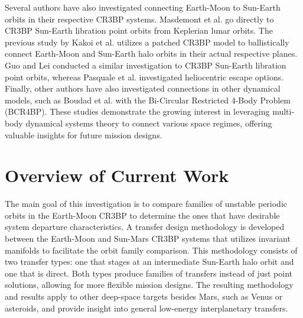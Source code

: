 Several authors have also investigated connecting Earth-Moon to Sun-Earth orbits in their
respective CR3BP systems. Masdemont et al. go directly to CR3BP Sun-Earth libration point orbits
from Keplerian lunar orbits\cite{Masdemont:2021}. The previous study by Kakoi et al. utilizes a
patched CR3BP model to ballistically connect Earth-Moon and Sun-Earth halo orbits in their actual
respective planes\cite{Kakoi:2014}. Guo and Lei conducted a similar investigation to CR3BP
Sun-Earth libration point orbits\cite{Guo:2019}, whereas Pasquale et al. investigated heliocentric
escape options\cite{Pasquale:2021}. Finally, other authors have also investigated connections in
other dynamical models, such as Boudad et al. with the Bi-Circular Restricted 4-Body Problem
(BCR4BP)\cite{Boudad:2021}. These studies demonstrate the growing interest in leveraging multi-body
dynamical systems theory to connect various space regimes, offering valuable insights for future
mission designs.

\section{Overview of Current Work}
The main goal of this investigation is to compare families of unstable periodic orbits in the
Earth-Moon CR3BP to determine the ones that have desirable system departure characteristics. A
transfer design methodology is developed between the Earth-Moon and Sun-Mars CR3BP systems that
utilizes invariant manifolds to facilitate the orbit family comparison. This methodology consists
of two transfer types: one that stages at an intermediate Sun-Earth halo orbit and one that is
direct. Both types produce families of transfers instead of just point solutions, allowing for more
flexible mission designs. The resulting methodology and results apply to other deep-space targets
besides Mars, such as Venus or asteroids, and provide insight into general low-energy
interplanetary transfers.

